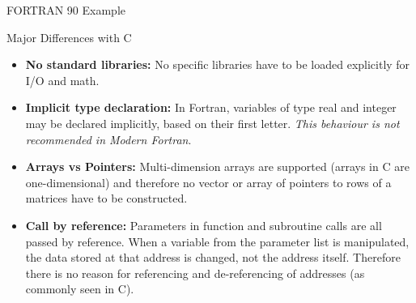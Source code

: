 \documentclass[10pt,t]{beamer}
\begin{document}
\begin{frame}[fragile]{FORTRAN 90 Example}
  \begin{eblock}{SAXPY Code}
    Fortran},basicstyle=\fontsize{6}{5}\selectfont\ttfamily]{./Exercise/saxpy.f90}
  \end{eblock}
\end{frame}

\begin{frame}{Major Differences with C}
  \begin{itemize}
    \item \textbf{No standard libraries:} No specific libraries have to be loaded explicitly for I/O and math.
    \item \textbf{Implicit type declaration:} In Fortran, variables of type real and integer may be declared implicitly, based on their first letter. {\em This behaviour is not recommended in Modern Fortran}.
    \item \textbf{Arrays vs Pointers:} Multi-dimension arrays are supported (arrays in C are one-dimensional) and therefore no vector or array of pointers to rows of a matrices have to be constructed.
    \item \textbf{Call by reference:} Parameters in function and subroutine calls are all passed by reference. When a variable from the parameter list is manipulated, the data stored at that address is changed, not the address itself. Therefore there is no reason for referencing and de-referencing of addresses (as commonly seen in C). 
  \end{itemize}
\end{frame}
\end{document}
